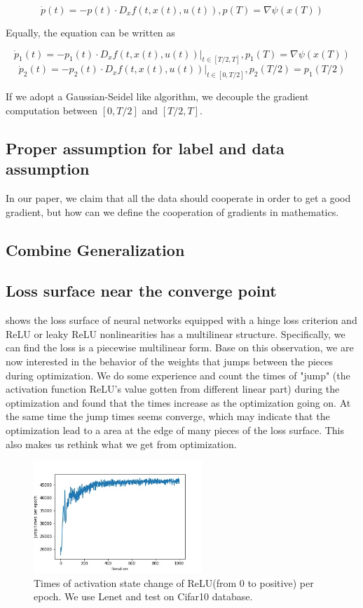 \documentclass{article}
\theoremstyle{plain}
\theoremstyle{definition}
\begin{document}
$$
\dot p(t) = -p(t)\cdot D_xf(t,x(t),u(t)),p(T)=\nabla \psi(x(T))
$$

Equally, the equation can be written as

$$
\dot p_1(t) = -p_1(t)\cdot D_xf(t,x(t),u(t))|_{t\in[T/2,T]},p_1(T)=\nabla \psi(x(T))$$
$$
\dot p_2(t) = -p_2(t)\cdot D_xf(t,x(t),u(t))|_{t\in[0,T/2]},p_2(T/2)=p_1(T/2)
$$

If we adopt a Gaussian-Seidel like algorithm, we decouple the gradient computation between $[0,T/2]$ and $[T/2,T]$.

\subsection{Proper assumption for label and data assumption}

In our paper, we claim that all the data should cooperate in order to get a good gradient, but how can we define the cooperation of gradients in mathematics.

\subsection{Combine Generalization}

\subsection{Loss surface near the converge point}
\cite{DBLP:journals/corr/abs-1712-10132} shows the loss surface of neural networks equipped with a hinge loss criterion and ReLU or leaky ReLU nonlinearities has a multilinear structure. Specifically, we can find the loss is a piecewise multilinear form. Base on this observation, we are now interested in the behavior of the weights that jumps between the pieces during optimization. We do some experience and count the times of "jump" (the activation function ReLU's value gotten from different linear part) during the optimization and found that the times increase as the optimization going on. At the same time the jump times seems converge, which may indicate that the optimization lead to a area at the edge of many pieces of the loss surface. This also makes us rethink what we get from optimization.

\begin{figure}[H]
	\centering
	\includegraphics[width=2.5in]{PieceJump.jpg}
	\caption{Times of activation state change of ReLU(from 0 to positive) per epoch. We use Lenet and test on Cifar10 database.}
	\label{piecejump}
\end{figure}



\end{document}
